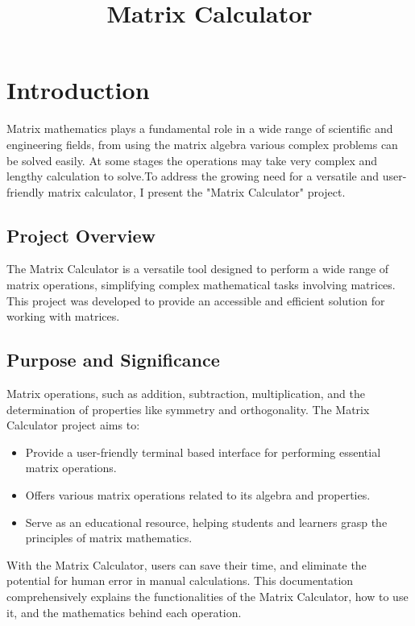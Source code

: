 \documentclass{article}
\title{\textbf{Matrix Calculator}}
\author{}
\date{}
\begin{document}
\maketitle

\section{Introduction}
Matrix mathematics plays a fundamental role in a wide range of scientific and engineering fields, from  using the matrix algebra various complex problems can be solved easily.
At some stages the operations may take very complex and lengthy calculation to solve.To address the growing need for a versatile and user-friendly matrix calculator, I present the "Matrix Calculator" project.

\subsection{Project Overview}
The Matrix Calculator is a versatile tool designed to perform a wide range of matrix operations, simplifying complex mathematical tasks involving matrices. This project was developed to provide an accessible and efficient solution for working with matrices. 

\subsection{Purpose and Significance}
Matrix operations, such as addition, subtraction, multiplication, and the determination of properties like symmetry and orthogonality. The Matrix Calculator project aims to:

\begin{itemize}
    \item Provide a user-friendly terminal based interface for performing essential matrix operations.
    \item Offers various matrix operations related to its algebra and properties.
    \item Serve as an educational resource, helping students and learners grasp the principles of matrix mathematics.
\end{itemize}

With the Matrix Calculator, users can save their time, and eliminate the potential for human error in manual calculations. This documentation comprehensively explains the functionalities of the Matrix Calculator, how to use it, and the mathematics behind each operation.
\end{document}
